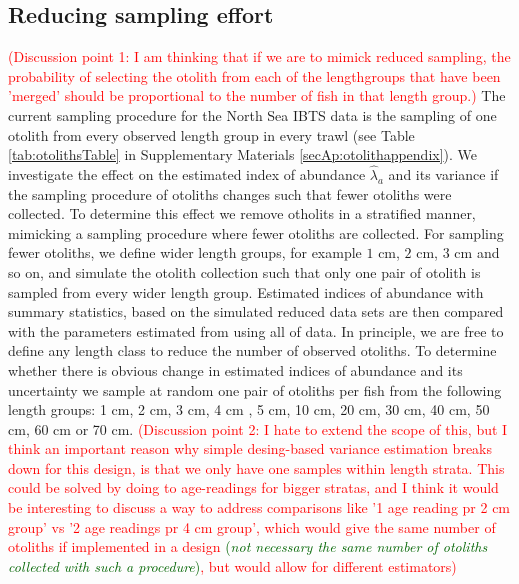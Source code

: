 \documentclass[a4paper 12pt]{article}
\numberwithin{equation}{section}
\newcommand{\ed}[1]{\textcolor{red}{#1}}
\newcommand{\olav}[1]{\textcolor{darkgreen}{#1}}
\begin{document}
\subsection{Reducing sampling effort}
\label{sec:optimizationsampling}
\ed{(Discussion point 1: I am thinking that if we are to mimick reduced sampling, the probability of selecting the otolith from each of the lengthgroups that have been 'merged' should be proportional to the number of fish in that length group.)}
The current sampling procedure for the North Sea IBTS data is the sampling of one otolith from every observed length group in every trawl (see Table \ref{tab:otolithsTable} in Supplementary Materials \ref{secAp:otolithappendix}). We investigate the effect on the estimated index of abundance $\hat{\lambda}_{a}$ and its variance if the sampling procedure of otoliths changes such that fewer otoliths were collected. To determine this effect we remove otholits in a stratified manner, mimicking a sampling procedure where fewer otoliths are collected. For sampling fewer otoliths, we define wider length groups, for example $1$ cm, $2$ cm, $3$ cm and so on,  and simulate the otolith  collection such that only one pair of otolith is sampled from every wider length group. Estimated indices of abundance with summary statistics, based on the simulated reduced data sets are then compared with the parameters estimated from using all of data. In principle, we are free to define any length class to reduce the number of observed otoliths. To determine whether there is obvious change in estimated indices of abundance and its uncertainty we sample at random one pair of otoliths per fish from the following length groups: 1 cm, 2 cm,  3 cm, 4 cm , 5 cm,  10 cm, 20 cm, 30 cm, 40 cm, 50 cm, 60 cm or 70 cm. 
\ed{(Discussion point 2: I hate to extend the scope of this, but I think an important reason why simple desing-based variance estimation breaks down for this design, is that we only have one samples within length strata. This could be solved by doing to age-readings for bigger stratas, and I think it would be interesting to discuss a way to address comparisons like '1 age reading pr 2 cm group' vs '2 age readings pr 4 cm group', which would give the same number of otoliths if implemented in a design \olav{(\textit{not necessary the same number of otoliths collected with such a procedure})}, but would allow for different estimators)}
\end{document}
